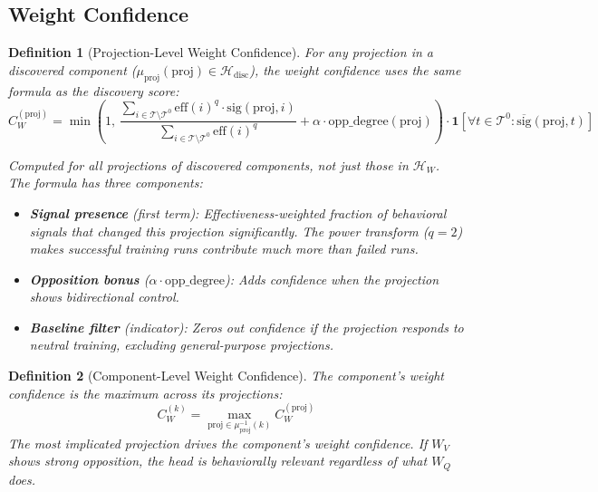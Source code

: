 \documentclass[11pt]{article}
\newtheorem{definition}{Definition}[section]
\begin{document}
\subsection{Weight Confidence}
\label{sec:weight-confidence}

\begin{definition}[Projection-Level Weight Confidence]
\label{def:projection-level-weight-confidence}
For any projection in a discovered component ($\mu_{\text{proj}}(\text{proj}) \in \mathcal{H}_{\text{disc}}$), the weight confidence uses the same formula as the discovery score:
\begin{equation}
C^{(\text{proj})}_W = \min\left(1,\, \frac{\sum_{i \in \mathcal{T} \setminus \mathcal{T}^0} \text{eff}(i)^q \cdot \text{sig}(\text{proj}, i)}{\sum_{i \in \mathcal{T} \setminus \mathcal{T}^0} \text{eff}(i)^q} + \alpha \cdot \text{opp\_degree}(\text{proj})\right) \cdot \mathbf{1}\left[\forall t \in \mathcal{T}^0: \overline{\text{sig}}(\text{proj}, t)\right]
\end{equation}

Computed for \emph{all} projections of discovered components, not just those in $\mathcal{H}_W$. The formula has three components:
\begin{itemize}[nosep]
\item \textbf{Signal presence} (first term): Effectiveness-weighted fraction of behavioral signals that changed this projection significantly. The power transform ($q=2$) makes successful training runs contribute much more than failed runs.
\item \textbf{Opposition bonus} ($\alpha \cdot \text{opp\_degree}$): Adds confidence when the projection shows bidirectional control.
\item \textbf{Baseline filter} (indicator): Zeros out confidence if the projection responds to neutral training, excluding general-purpose projections.
\end{itemize}
\end{definition}

\begin{definition}[Component-Level Weight Confidence]
\label{def:component-level-weight-confidence}
The component's weight confidence is the maximum across its projections:
\begin{equation}
C^{(k)}_W = \max_{\text{proj} \in \mu_{\text{proj}}^{-1}(k)} C^{(\text{proj})}_W
\end{equation}
The most implicated projection drives the component's weight confidence. If $W_V$ shows strong opposition, the head is behaviorally relevant regardless of what $W_Q$ does.
\end{definition}
\end{document}
